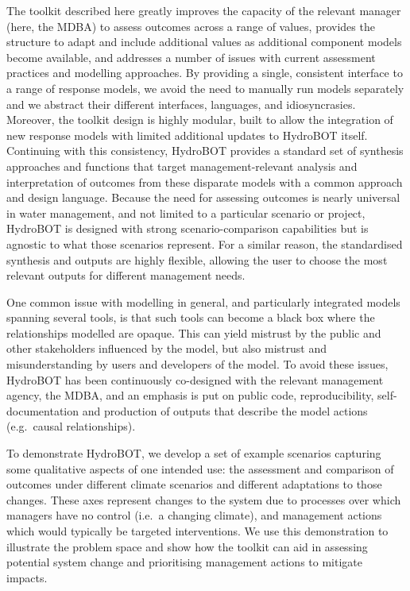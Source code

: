 \documentclass[
  number]{elsarticle}
\begin{document}
The toolkit described here greatly improves the capacity of the relevant
manager (here, the MDBA) to assess outcomes across a range of values,
provides the structure to adapt and include additional values as
additional component models become available, and addresses a number of
issues with current assessment practices and modelling approaches. By
providing a single, consistent interface to a range of response models,
we avoid the need to manually run models separately and we abstract
their different interfaces, languages, and idiosyncrasies. Moreover, the
toolkit design is highly modular, built to allow the integration of new
response models with limited additional updates to HydroBOT itself.
Continuing with this consistency, HydroBOT provides a standard set of
synthesis approaches and functions that target management-relevant
analysis and interpretation of outcomes from these disparate models with
a common approach and design language. Because the need for assessing
outcomes is nearly universal in water management, and not limited to a
particular scenario or project, HydroBOT is designed with strong
scenario-comparison capabilities but is agnostic to what those scenarios
represent. For a similar reason, the standardised synthesis and outputs
are highly flexible, allowing the user to choose the most relevant
outputs for different management needs.

One common issue with modelling in general, and particularly integrated
models spanning several tools, is that such tools can become a black box
where the relationships modelled are opaque. This can yield mistrust by
the public and other stakeholders influenced by the model, but also
mistrust and misunderstanding by users and developers of the model. To
avoid these issues, HydroBOT has been continuously co-designed with the
relevant management agency, the MDBA, and an emphasis is put on public
code, reproducibility, self-documentation and production of outputs that
describe the model actions (e.g.~causal relationships).

To demonstrate HydroBOT, we develop a set of example scenarios capturing
some qualitative aspects of one intended use: the assessment and
comparison of outcomes under different climate scenarios and different
adaptations to those changes. These axes represent changes to the system
due to processes over which managers have no control (i.e.~a changing
climate), and management actions which would typically be targeted
interventions. We use this demonstration to illustrate the problem space
and show how the toolkit can aid in assessing potential system change
and prioritising management actions to mitigate impacts.
\end{document}
